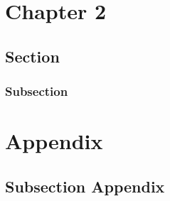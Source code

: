 \chapter{Chapter 2}


\section{Section}

\subsection{Subsection}
\cleardoublepage
\appendixheader

\setcounter{section}{0}
\setcounter{chapter}{0}
\renewcommand{\thesection}{A.\arabic{section}}
\renewcommand{\thechapter}{A}



\chapter*{Appendix}  %
\setcounter{section}{0}
\setcounter{chapter}{0}
\renewcommand{\thesection}{A.\arabic{section}}
\renewcommand{\thechapter}{A}  


\section{Subsection Appendix}

\cleardoublepage



